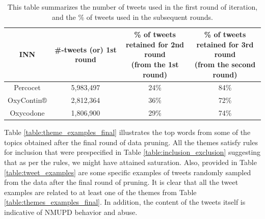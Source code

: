 \begin{table}
\begin{tabular}{|c|c|c|c|}
\hline
INN & \#-tweets (or) 1st round & \pbox{20cm}{\% of tweets \\retained for 2nd round \\(from the 1st round)}& \pbox{20cm}{\% of tweets \\retained for 3rd round \\(from the second round)} \\
\hline
Percocet &  5,983,497  & 24\% &84\%\\
OxyContin® & 2,812,364 &  36\% &72\% \\
Oxycodone  & 1,806,900 &  29\% &74\% \\
\hline
\end{tabular}
\caption[Summary of \# of tweets in each round]{This table summarizes the number of tweets used in the first round of iteration, 
and the \% of tweets used in the subsequent rounds.}
\label{table:iteration_tweetcounts}
\end{table}

Table \ref{table:theme_examples_final} illustrates the 
top words from some of the topics obtained after the 
final round of data pruning. All the themes satisfy rules for inclusion 
that were prespecified in Table \ref{table:inclusion_exclusion} suggesting that 
as per the rules, we might have attained saturation. Also, provided in Table 
\ref{table:tweet_examples} are some specific examples of tweets 
randomly sampled from the data after the final round of pruning. 
It is clear that all the tweet examples are related to at 
least one of the themes from Table \ref{table:themes_examples_final}.
In addition, the content of the tweets itself is indicative of NMUPD behavior and abuse.

